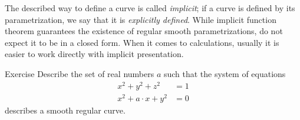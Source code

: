 The described way to define a curve is called \emph{implicit};
if a curve is defined by its parametrization, we say that it is \emph{explicitly defined}.
While implicit function theorem guarantees the existence of regular smooth parametrizations, do not expect it to be in a closed form. 
When it comes to calculations, usually it is easier to work directly with implicit presentation. 


\begin{thm}{Exercise}\label{ex:viviani}
Describe the set of real numbers $a$
such that the system of equations
\begin{align*}
x^2+y^2+z^2&=1
\\
x^2+a\cdot x+y^2&=0
\end{align*}
describes a smooth regular curve.
\end{thm}



